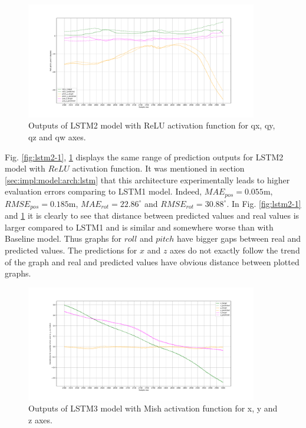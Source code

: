 \begin{figure}
	\begin{center}
		\includegraphics[width=0.9\textwidth, keepaspectratio]{gfx/lstm2_relu-roll_pitch_yaw.pdf}
		\caption{\label{fig:lstm2-2} Outputs of LSTM2 model with ReLU activation function for qx, qy, qz and qw axes.}
	\end{center}
\end{figure}

Fig. \ref{fig:lstm2-1}, \ref{fig:lstm2-2} displays the same range of prediction outputs for LSTM2 model with $ReLU$ activation function. It was mentioned in section \ref{sec:impl:model:arch:lstm} that this architecture experimentally leads to higher evaluation errors comparing to LSTM1 model. Indeed,  $MAE_{pos} = 0.055$m, $RMSE_{pos} = 0.185$m, $MAE_{rot} = 22.86^{\circ}$ and $RMSE_{rot}  =30.88^{\circ}$. In Fig. \ref{fig:lstm2-1} and \ref{fig:lstm2-2} it is clearly to see that distance between predicted values and real values is larger compared to LSTM1 and is similar and somewhere worse than with Baseline model. Thus graphs for $roll$ and $pitch$ have bigger gaps between real and predicted values. The predictions for $x$ and $z$ axes do not exactly follow the trend of the graph and real and predicted values have obvious distance between plotted graphs. 


\begin{figure}[t!]
	\begin{center}
		\includegraphics[width=0.9\textwidth, keepaspectratio]{gfx/lstm3_mish-xyz_position.pdf}
		\caption{\label{fig:lstm3-1} Outputs of LSTM3 model with Mish activation function for x, y and z axes.}
	\end{center}
\end{figure}

